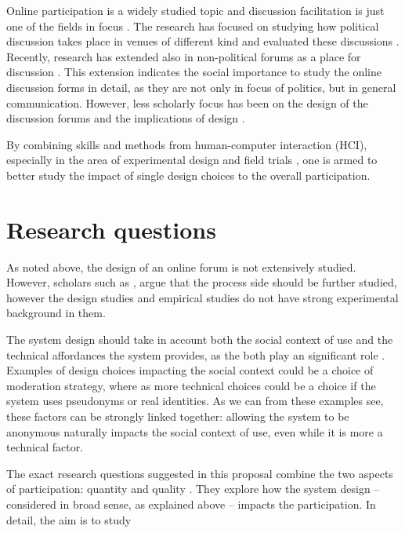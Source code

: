 \documentclass{article}
\begin{document}
Online participation is a widely studied topic and discussion facilitation is just one of the fields in focus . The research has focused on studying how political discussion takes place in venues of different kind  and evaluated these discussions . Recently, research has extended also in non-political forums as a place for discussion \cite{graham12}. This extension indicates the social importance to study the online discussion forms in detail, as they are not only in focus of politics, but in general communication. However, less scholarly focus has been on the design of the discussion forums and the implications of design .

By combining skills and methods from human-computer interaction (HCI), especially in the area of experimental design and field trials , one is armed to better study the impact of single design choices to the overall participation.

\section{Research questions}

As noted above, the design of an online forum is not extensively studied. However, scholars such as , argue that the process side should be further studied, however the design studies and empirical studies do not have strong experimental background in them.

The system design should take in account both the social context of use and the technical affordances the system provides, as the both play an significant role . Examples of design choices impacting the social context could be a choice of moderation strategy, where as more technical choices could be a choice if the system uses pseudonyms or real identities. As we can from these examples see, these factors can be strongly linked together: allowing the system to be anonymous naturally impacts the social context of use, even while it is more a technical factor.

The exact research questions suggested in this proposal combine the two aspects of participation: quantity and quality . They explore how the system design -- considered in broad sense, as explained above -- impacts the participation. In detail, the aim is to study
\end{document}
